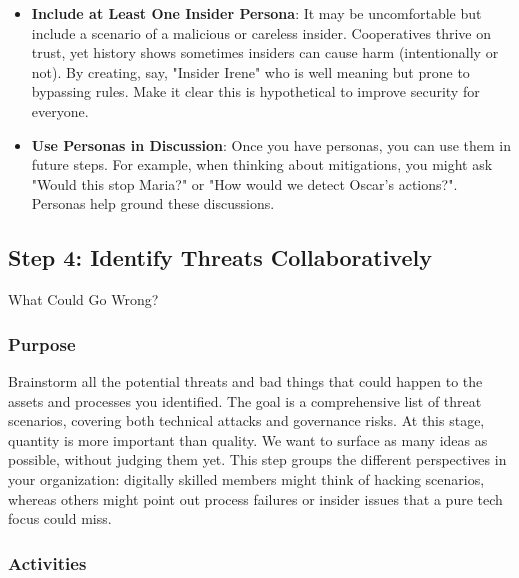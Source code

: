 \begin{itemize}
    \item \textbf{Include at Least One Insider Persona}: It may be uncomfortable but include a scenario of
    a malicious or careless insider. Cooperatives thrive on trust, yet history shows sometimes insiders
    can cause harm (intentionally or not). By creating, say, "Insider Irene" who is well meaning but
    prone to bypassing rules. Make it clear this is hypothetical to improve security for everyone.
    
    \item \textbf{Use Personas in Discussion}: Once you have personas, you can use them in future steps.
    For example, when thinking about mitigations, you might ask "Would this stop Maria?" or
    "How would we detect Oscar's actions?". Personas help ground these discussions.

\end{itemize}

\subsection{Step 4: Identify Threats Collaboratively}
\label{subsec:Step4}

What Could Go Wrong?

\subsubsection{Purpose}

Brainstorm all the potential threats and bad things that could happen to the
assets and processes you identified. The goal is a comprehensive list of threat
scenarios, covering both technical attacks and governance risks. At this
stage, quantity is more important than quality. We want to surface as many
ideas as possible, without judging them yet. This step groups the different
perspectives in your organization: digitally skilled members might think
of hacking scenarios, whereas others might point out process failures or insider
issues that a pure tech focus could miss.

\subsubsection{Activities}

